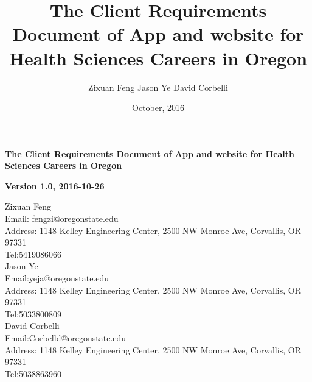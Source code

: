 \documentclass[letterpaper,10pt]{article}
\title {The Client Requirements Document of App and website for Health Sciences Careers in Oregon }
\author{Zixuan Feng
	   Jason Ye
	   David Corbelli }
\date{October, 2016}
\begin{document}
\clearpage\setcounter{page}{1}\pagestyle{Standard}
\thispagestyle{FirstPage}

\bigskip

{\centering{}\bfseries\color{black}
The Client Requirements Document of App and website for Health Sciences Careers in Oregon
\par}


\bigskip

{\centering{}\bfseries\color{black}
Version 1.0, 2016-10-26
\par}


 \vspace{2cm}
\noindent 
Zixuan Feng \\
Email: fengzi@oregonstate.edu\\
Address: 1148 Kelley Engineering Center, 2500 NW Monroe Ave, Corvallis, OR 97331\\
Tel:5419086066\\

 \vspace{1cm}
\noindent 
Jason Ye \\
Email:yeja@oregonstate.edu\\
Address: 1148 Kelley Engineering Center, 2500 NW Monroe Ave, Corvallis, OR 97331\\
Tel:5033800809\\

 \vspace{1cm}
\noindent 
David Corbelli \\
Email:Corbelld@oregonstate.edu\\
Address: 1148 Kelley Engineering Center, 2500 NW Monroe Ave, Corvallis, OR 97331\\
Tel:5038863960\\










\bigskip
\end{document}
